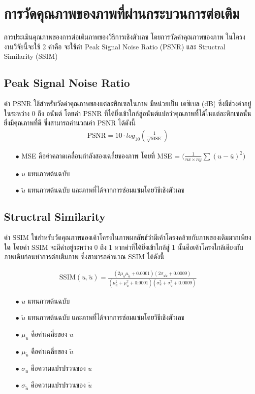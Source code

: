 \section{การวัดคุณภาพของภาพที่ผ่านกระบวนการต่อเติม}

\hspace{1cm} การประเมินคุณภาพของการต่อเติมภาพของวิธีการเชิงตัวเลข โดยการวัดค่าคุณภาพของภาพ ในโครงงานวิจัยนี้จะใช้ 2 ค่าคือ จะใช้ค่า Peak Signal Noise Ratio (PSNR) \cite{ref:PSNR} และ Structral Similarity (SSIM) \cite{ref:SSIM} 

\subsection{Peak Signal Noise Ratio}

\hspace{1cm} ค่า PSNR ใช้สำหรับวัดค่าคุณภาพของแต่ละพิกเซลในภาพ มีหน่วยเป็น เดซิเบล (dB) ซึ่งมีช่วงค่าอยู่ในระหว่าง 0 ถึง อนันต์ โดยค่า PSNR ที่ได้ยิ่งเข้าใกล้สู่อนันต์แปลว่าคุณภาพที่ได้ในแต่ละพิกเซลนั้นยิ่งมีคุณภาพที่ดี ซึ่งสามารถคำนวณค่า PSNR ได้ดังนี้
\begin{align}
    \text{PSNR}  = 10 \cdot log_{10} ( \frac{1}{\sqrt{\text{MSE}}} )
\end{align}
\begin{itemize}
	\item[$\bullet$] MSE คือค่าคลาดเคลื่อนกำลังสองเฉลี่ยของภาพ โดยที่ MSE = $\bigg( \frac{1}{nx \times ny} \sum (u - \bar{u})^2  \bigg)$
	\item[$\bullet$] $u$ แทนภาพต้นฉบับ
	\item[$\bullet$] $\tilde{u}$  แทนภาพต้นฉบับ และภาพที่ได้จากการซ่อมแซมโดยวิธีเชิงตัวเลข
\end{itemize}

\subsection{Structral Similarity}
\hspace{1cm} ค่า SSIM ใชสำหรับวัดคุณภาพของเค้าโครงในภาพผลลัพธ์ว่ามีเค้าโครงคล้ายกับภาพของเดิมมากเพียงใด โดยค่า SSIM จะมีค่าอยู่ระหว่าง 0 ถึง 1 หากค่าที่ได้ยิ่งเข้าใกล้สู่ 1 นั้นคือเค้าโครงใกล้เคียงกับภาพเดิมก่อนทำการต่อเติมภาพ ซึ่งสามารถคำนวณ SSIM ได้ดังนี้

\begin{align*}
	\text{SSIM}(u,\tilde{u}) = \frac{(2\mu_u\mu_{\tilde{u}} + 0.0001)(2\sigma_{u\tilde{u}} + 0.0009)}{(\mu_u^2+\mu_{\tilde{u}}^2+0.0001)(\sigma_u^2+\sigma_{\tilde{u}}^2+0.0009)}
\end{align*}

\begin{itemize}
	\item[$\bullet$] $u$ แทนภาพต้นฉบับ
	\item[$\bullet$] $\tilde{u}$  แทนภาพต้นฉบับ และภาพที่ได้จากการซ่อมแซมโดยวิธีเชิงตัวเลข
	\item[$\bullet$] $\mu_u$ คือค่าเฉลี่ยของ $u$
	\item[$\bullet$] $\mu_{\tilde{u}}$ คือค่าเฉลี่ยของ $\tilde{u}$
	\item[$\bullet$]  $\sigma_u$ คือความแปรปรวนของ $u$ 
	\item[$\bullet$] $\sigma_{\tilde{u}}$ คือความแปรปรวนของ $\tilde{u}$
\end{itemize}
